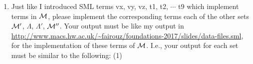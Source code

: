 \documentclass[11pt]{article}
\begin{document}
\begin{enumerate}
\begin{sideways}
\begin{tabular}{|l|l|l|l|l|}
	$((\lambda x.x) z)$ & $\langle z\rangle [x]x$ & $(I'' z)$ & $(\lambda 1)3$ & $\langle3\rangle[]1$	\\
	$((((\lambda x.x) (\lambda y.x)) z) (((\lambda x.x) (\lambda y.x)) z))$ & $\langle \langle z\rangle \langle [y]x\rangle [x]x\rangle \langle z\rangle \langle [y]x\rangle [x]x$ & $(((I'' (K'' x)) z) ((I'' (K'' x)) z))$ &$(\lambda1)(\lambda2)3((\lambda1)(\lambda2)3)$ & $\langle\langle3\rangle\langle[]2\rangle[]1\rangle\langle3\rangle\langle[]2\rangle[]1$	\\
	$(\lambda x.(\lambda y.(\lambda z.((x z) (y z)))))$ & $[x][y][z]\langle \langle z\rangle y\rangle \langle z\rangle x$ & $S''$ & $\lambda\lambda\lambda31(21)$ & $[][][]\langle\langle1\rangle2\rangle\langle1\rangle3$ \\
	$(((\lambda x.(\lambda y.(\lambda z.((x z) (y z))))) (\lambda x.x)) (\lambda x.x))$ & $\langle [x]x\rangle \langle [x]x\rangle [x][y][z]\langle \langle z\rangle y\rangle \langle z\rangle x$ & $((S'' I'') I'')$ & $(\lambda\lambda\lambda31(21))(\lambda1)(\lambda1)$ & $\langle[]1\rangle\langle[]1\rangle[][][]\langle\langle1\rangle2\rangle\langle1\rangle3$	\\
	$(\lambda z.(z ((\lambda x.x) z)))$ & $[z]\langle \langle z\rangle [x]x\rangle z$ & $((S'' I'') I'')$ & $\lambda1((\lambda1)1)$ & $[]\langle\langle1\rangle[]1\rangle1$	\\
	$((\lambda z.(z ((\lambda x.x) z))) (((\lambda x.x) (\lambda y.x)) z))$ & $\langle \langle z\rangle \langle [y]x\rangle [x]x\rangle [z]\langle \langle z\rangle [x]x\rangle z$ & $(((S'' I'') I'') ((I'' (K'' x)) z))$ & $(\lambda1((\lambda1)1))((\lambda1)(\lambda2)3)$ & $\langle\langle3\rangle\langle[]2\rangle[]1\rangle[]\langle\langle1\rangle[]1\rangle1$	\\
        \hline

        \end{tabular}
    \end{sideways} 
        
        
  \item
    Just like I introduced SML terms vx, vy, vz, t1, t2, $\cdots$ t9
    which implement terms in  ${\cal M}$, please implement the corresponding terms each of the other sets ${\cal M}'$, $\Lambda$, $\Lambda'$, ${\cal M}''$.  Your output must be like my output in
    \url{http://www.macs.hw.ac.uk/~fairouz/foundations-2017/slides/data-files.sml},
    for the implementation of these terms of ${\cal M}$. I.e., your output for each set must be similar to the following:
    \hfill{(1)} %


\end{enumerate}
\end{document}
